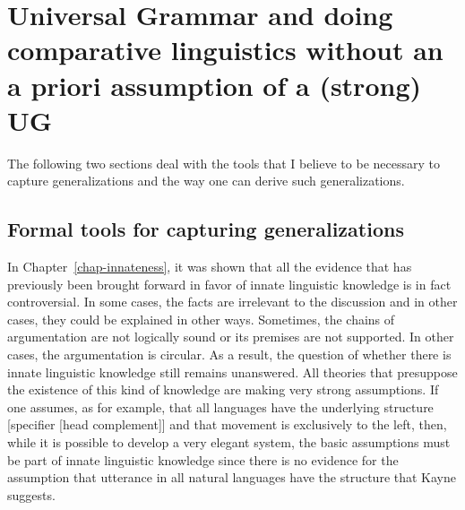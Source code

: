 
\chapter[Universal Grammar and comparative linguistics without UG]{Universal Grammar and doing comparative linguistics without an a priori assumption of a (strong) UG}
\label{Abschnitt-UG-mit-Hierarchie}

The following two sections deal with the tools that I believe to be necessary to capture
generalizations and the way one can derive such generalizations.

\section{Formal tools for capturing generalizations}

In Chapter~\ref{chap-innateness}, it was shown that all the evidence that has previously been
brought forward in favor of innate linguistic knowledge is in fact controversial. In some cases, the
facts are irrelevant to the discussion and in other cases, they could be explained in other
ways. Sometimes, the chains of argumentation are not logically sound or its premises are not
supported. In other cases, the argumentation is circular. As a result, the question of whether there
is innate linguistic knowledge still remains unanswered. All theories that presuppose the existence
of this kind of knowledge are making very strong assumptions. If one assumes, as \citet{Kayne94a-u}
for example, that all languages have the underlying structure [specifier [head complement]] and that
movement is exclusively to the left, then, while it is possible to develop a very elegant system,
the basic assumptions must be part of innate linguistic knowledge since there is no evidence for the
assumption that utterance in all natural languages have the structure that Kayne suggests.

